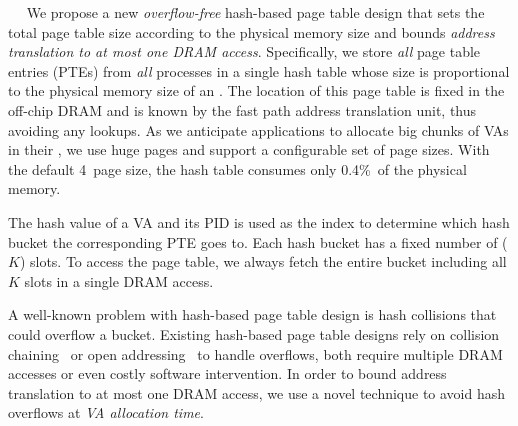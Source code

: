 ~~
We propose a new {\em overflow-free} hash-based page table design that sets the total page table size according to the physical memory size 
and bounds \textit{address translation to at most one DRAM access}.
Specifically, we store {\em all} page table entries (PTEs) from {\em all} processes in a single hash table 
whose size is proportional to the physical memory size of an \MN. 
The location of this page table is fixed in the off-chip DRAM and is known by the fast path address translation unit, thus avoiding any lookups.
As we anticipate applications to allocate big chunks of VAs in their \rspace, we use huge pages and support a configurable set of page sizes.
With the default 4\MB\ page size, the hash table consumes only 0.4\%\ of the physical memory.



The hash value of a VA and its PID is used as the index to determine which hash bucket the corresponding PTE goes to.
Each hash bucket has a fixed number of ($K$) slots.
To access the page table, we always fetch
the entire bucket including all $K$ slots in a single DRAM access.

A well-known problem with hash-based page table design is hash collisions that could overflow a bucket.
Existing hash-based page table designs rely on collision chaining~\cite{TransCache-isca10} or open addressing~\cite{hashpgtable-sigmetrics16} to handle overflows, both require multiple DRAM accesses or even costly software intervention.
In order to bound address translation to at most one DRAM access, we use a novel technique to avoid hash overflows at \textit{VA allocation time}.

